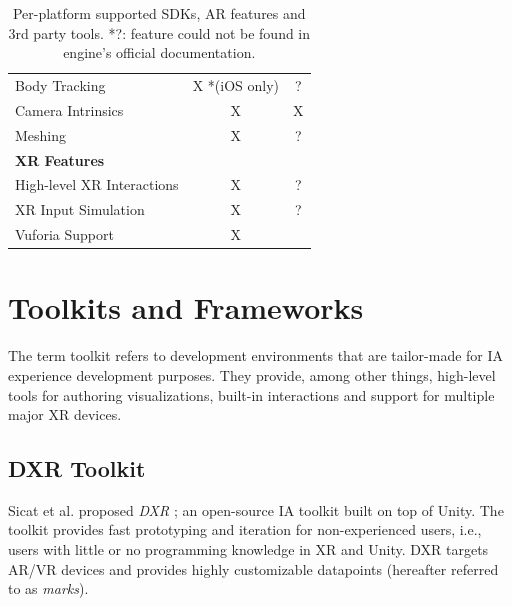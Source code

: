 \documentclass{vgtc}                          %
\begin{document}
\begin{table}
\begin{tabular}{l c c}
		Body Tracking                 & X *(iOS only)                         & ?                        \\
		Camera Intrinsics             & X                                     & X                        \\
		Meshing                       & X                                     & ?                        \\
		\midrule
		\textbf{XR Features}          &                                       &                          \\
		\midrule
		High-level XR Interactions    & X                                     & ?                        \\
		XR Input Simulation           & X                                     & ?                        \\
		\midrule
		Vuforia Support               & X                                     &                          \\
		\bottomrule
	\end{tabular}


	\medskip

	\caption{Per-platform supported SDKs, AR features and 3rd party tools. *?:
		feature could not be found in engine's official documentation.}
	\label{table:1}
\end{table}

\section{Toolkits and Frameworks}

The term toolkit refers to development environments that are tailor-made for
IA experience development purposes. They provide, among other things,
high-level tools for authoring visualizations, built-in interactions and
support for multiple major XR devices.

\subsection{DXR Toolkit}

\noindent Sicat et al. proposed \textit{DXR} \cite{dxr_toolkit}; an open-source \cite{dxr:repo} IA toolkit
built on top of Unity. The toolkit provides fast prototyping and iteration for non-experienced users, i.e.,
users with little or no programming knowledge in XR and Unity. DXR targets AR/VR devices and provides highly
customizable datapoints (hereafter referred to as \textit{marks}). 
\end{document}
